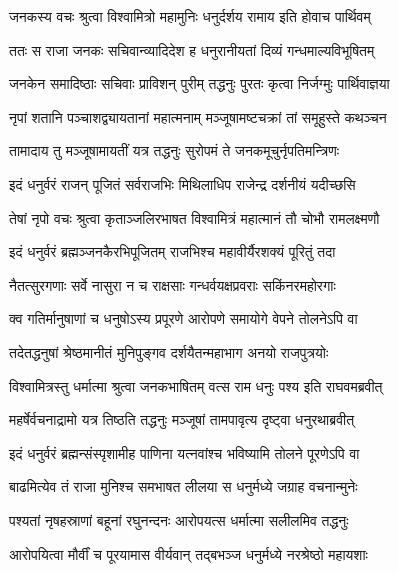 
\twolineshloka
{जनकस्य वचः श्रुत्वा विश्वामित्रो महामुनिः}
{धनुर्दर्शय रामाय इति होवाच पार्थिवम्} %

\twolineshloka
{ततः स राजा जनकः सचिवान्व्यादिदेश ह}
{धनुरानीयतां दिव्यं गन्धमाल्यविभूषितम्} %

\twolineshloka
{जनकेन समादिष्ठाः सचिवाः प्राविशन् पुरीम्}
{तद्धनुः पुरतः कृत्वा निर्जग्मुः पार्थिवाज्ञया} %

\twolineshloka
{नृपां शतानि पञ्चाशद्व्यायतानां महात्मनाम्}
{मञ्जूषामष्टचक्रां तां समूहुस्ते कथञ्चन} %

\twolineshloka
{तामादाय तु मञ्जूषामायतीं यत्र तद्धनुः}
{सुरोपमं ते जनकमूचुर्नृपतिमन्त्रिणः} %

\twolineshloka
{इदं धनुर्वरं राजन् पूजितं सर्वराजभिः}
{मिथिलाधिप राजेन्द्र दर्शनीयं यदीच्छसि} %

\twolineshloka
{तेषां नृपो वचः श्रुत्वा कृताञ्जलिरभाषत}
{विश्वामित्रं महात्मानं तौ चोभौ रामलक्ष्मणौ} %

\twolineshloka
{इदं धनुर्वरं ब्रह्मञ्जनकैरभिपूजितम्}
{राजभिश्च महावीर्यैरशक्यं पूरितुं तदा} %

\twolineshloka
{नैतत्सुरगणाः सर्वे नासुरा न च राक्षसाः}
{गन्धर्वयक्षप्रवराः सकिंनरमहोरगाः} %

\twolineshloka
{क्व गतिर्मानुषाणां च धनुषोऽस्य प्रपूरणे}
{आरोपणे समायोगे वेपने तोलनेऽपि वा} %

\twolineshloka
{तदेतद्धनुषां श्रेष्ठमानीतं मुनिपुङ्गव}
{दर्शयैतन्महाभाग अनयो राजपुत्रयोः} %

\twolineshloka
{विश्वामित्रस्तु धर्मात्मा श्रुत्वा जनकभाषितम्}
{वत्स राम धनुः पश्य इति राघवमब्रवीत्} %

\twolineshloka
{महर्षेर्वचनाद्रामो यत्र तिष्ठति तद्धनुः}
{मञ्जूषां तामपावृत्य दृष्ट्वा धनुरथाब्रवीत्} %

\twolineshloka
{इदं धनुर्वरं ब्रह्मन्संस्पृशामीह पाणिना}
{यत्नवांश्च भविष्यामि तोलने पूरणेऽपि वा} %

\twolineshloka
{बाढमित्येव तं राजा मुनिश्च समभाषत}
{लीलया स धनुर्मध्ये जग्राह वचनान्मुनेः} %

\twolineshloka
{पश्यतां नृषहस्राणां बहूनां रघुनन्दनः}
{आरोपयत्स धर्मात्मा सलीलमिव तद्धनुः} %

\twolineshloka
{आरोपयित्वा मौर्वीं च पूरयामास वीर्यवान्}
{तद्बभञ्ज धनुर्मध्ये नरश्रेष्ठो महायशाः} %

